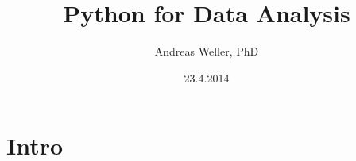 \documentclass[]{beamer}
\title[]{Python for Data Analysis} %
\author{Andreas Weller, PhD} %
\institute[WTCHG] %
{WTCHG - NHS %
}
\date{23.4.2014} %
\begin{document}
\begin{frame}
\titlepage %
\end{frame}



\section{Intro} %
\end{document}

